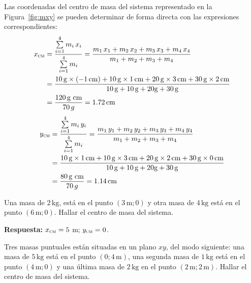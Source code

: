 \documentclass[addpoints]{exam}
\newcommand{\un}[1]{\text{#1}}
\newcommand{\rta}{\textbf{Respuesta: }}
\begin{document}
\begin{questions}
    \begin{solution}
    Las coordenadas del centro de masa del sistema representado en la Figura~\ref{fig:mxy} se pueden determinar de forma directa con las expresiones correspondientes:
    \begin{equation*}
        \begin{split}
        x_{\textsc{cm}} &= \frac{\sum\limits_{i=1}^4 m_i \, x_i}{\sum\limits_{i=1}^4 m_i}
                = \frac{m_1 \, x_1 + m_2 \, x_2 + m_3 \, x_3 + m_4 \, x_4}{m_1 + m_2 + m_3 + m_4} \\
                &= \frac{10 \, \text{g} \times (-1 \, \text{cm}) + 10 \, \text{g} \times 1 \, \text{cm} + 20 \, \text{g} \times 3 \, \text{cm} + 30 \, \text{g} \times 2 \, \text{cm}}{10 \, \text{g} + 10 \, \text{g} + 20 \text{g} + 30 \, \text{g}} \\
                & = \frac{120 \, \text{g cm}}{70 \, g}
                = 1.72 \, \text{cm}
        \end{split}
    \end{equation*}
    \begin{equation*}
        \begin{split}
        y_{\textsc{cm}} &= \frac{\sum\limits_{i=1}^4 m_i \, y_i}{\sum\limits_{i=1}^4 m_i}
                = \frac{m_1 \, y_1 + m_2 \, y_2 + m_3 \, y_3 + m_4 \, y_4}{m_1 + m_2 + m_3 + m_4} \\
                &= \frac{10 \, \text{g} \times 1 \, \text{cm} + 10 \, \text{g} \times 3 \, \text{cm} + 20 \, \text{g} \times 2 \, \text{cm} + 30 \, \text{g} \times 0 \, \text{cm}}{10 \, \text{g} + 10 \, \text{g} + 20 \text{g} + 30 \, \text{g}} \\
                & = \frac{80 \, \text{g cm}}{70 \, g}
                = 1.14 \, \text{cm}
        \end{split}
    \end{equation*}
    \end{solution}

    \question Una masa de $2 \, \un{kg}$, está en el punto $(3 \, \text{m}; 0)$ y otra masa de $4 \, \un{kg}$ está en el punto $(6 \, \text{m}; 0)$. Hallar el centro de masa del sistema.

    \rta $x_{\textsc{cm}} = 5$ m; $y_{\textsc{cm}} = 0$.

    \question Tres masas puntuales están situadas en un plano $xy$, del modo siguiente: una masa de $5 \, \un{kg}$ está en el punto $(0; 4 \, \text{m})$, una segunda masa de $1 \, \un{kg}$ está en el punto $(4 \, \text{m}; 0)$ y una última masa de $2 \, \un{kg}$ en el punto $(2 \, \text{m}; 2 \, \text{m})$. Hallar el centro de masa del sistema.


\end{questions}
\end{document}

